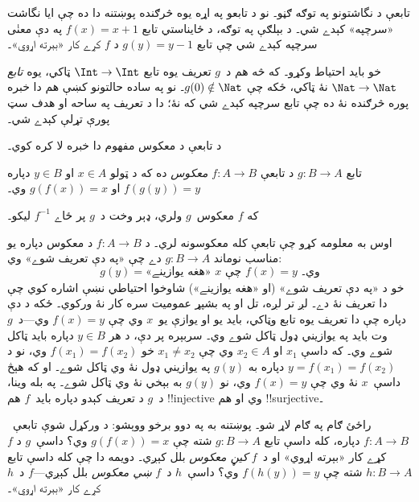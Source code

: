 \documentclass[../../../include/open-logic-section]{subfiles}
\begin{document}

\begin{explain}
تابعې د نگاشتونو په توګه ګڼو۔ نو د تابعو په اړه يوه څرګنده
پوښتنه دا ده چې ايا نگاشت «سرچپه» کېدے شي۔ د بېلګې په توګه،
د ځايناستي تابع $f(x) = x + 1$ په دې معنٰی سرچپه کېدے شي چې
تابع $g(y) = y - 1$ د $f$ کړے کار «بېرته اړوي»۔

خو بايد احتياط وکړو۔ که څه هم د~$g$ تعريف يوه تابع $\Int \to \Int$
ټاکي، يوه \emph{تابع} $\Nat \to \Nat$ نۀ ټاکي، ځکه چې
$g(0) \notin \Nat$۔ نو په ساده حالتونو کښې هم دا خبره پوره څرګنده
نۀ ده چې تابع سرچپه کېدے شي که نۀ؛ دا د تعريف په ساحه او هدف
سټ پورې تړلې کېدے شي۔

د تابعې د معکوس مفهوم دا خبره لا کره کوي۔
\end{explain}

\begin{defn}
تابع $g \colon B \to A$ د تابعې $f \colon A \to B$ \emph{معکوس}
ده که د ټولو $x \in A$ او $y \in B$ دپاره $f(g(y)) = y$ او
$g(f(x)) = x$ وي۔
\end{defn}

که $f$ معکوس~$g$ ولري، ډېر وخت د~$g$ پر ځاے $f^{-1}$ ليکو۔

\begin{explain}
اوس به معلومه کړو چې تابعې کله معکوسونه لري۔ د $f\colon A \to B$
د معکوس دپاره يو مناسب نوماند $g\colon B \to A$ دے چې «په دې
تعريف شوے» وي:
\[
g(y) = \text{«هغه يوازينے» $x$ چې $f(x) = y$ وي۔}
\]
خو د «په دې تعريف شوے» (او «هغه يوازينے») شاوخوا احتياطي نښې
اشاره کوي چې دا تعريف نۀ دے۔ لږ تر لږه، تل او په بشپړ عموميت
سره کار نۀ ورکوي۔ ځکه د دې دپاره چې دا تعريف يوه تابع وټاکي،
بايد يو او يوازې يو~$x$ وي چې $f(x) = y$ وي---د~$g$ وت بايد په
يوازيني ډول ټاکل شوے وي۔ سربېره پر دې، د هر $y \in B$ دپاره
بايد ټاکل شوے وي۔ که داسې $x_1$ او $x_2 \in A$ وي چې
$x_1 \neq x_2$ خو $f(x_1) = f(x_2)$ وي، نو د
$y = f(x_1) = f(x_2)$ دپاره به $g(y)$ په يوازيني ډول نۀ وي
ټاکل شوے۔ او که هېڅ داسې~$x$ نۀ وي چې $f(x) = y$ وي، نو $g(y)$
به بېخي نۀ وي ټاکل شوے۔ په بله وينا، د~$g$ د تعريف کېدو دپاره
بايد~$f$ هم !!{injective} وي او هم !!{surjective}۔

راځئ ګام په ګام لاړ شو۔ پوښتنه به په دوو برخو ووېشو: د ورکړل
شوې تابعې~$f\colon A \to B$ دپاره، کله داسې تابع $g\colon B \to A$
شته چې $g(f(x)) = x$ وي؟ داسې~$g$ د $f$ کړے کار «بېرته اړوي»
او د~$f$ \emph{کيڼ معکوس} بلل کېږي۔ دويمه دا چې کله داسې تابع
$h\colon B \to A$ شته چې $f(h(y)) = y$ وي؟ داسې~$h$ د~$f$
\emph{ښي معکوس} بلل کېږي---$f$ د~$h$ کړے کار «بېرته اړوي»۔
\end{explain}
\end{document}
